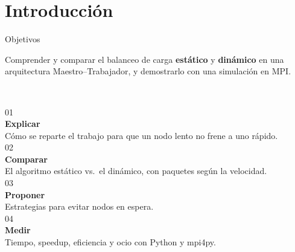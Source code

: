 \documentclass[aspectratio=169,11pt,t]{beamer}
\newcommand{\numeral}[2]{{\kalamL\fontsize{30}{32}\selectfont\color{#1}#2}}
\newcommand{\linea}{{\color{regla}\rule{\linewidth}{.5pt}}}
\begin{document}
\section{Introducción}
\begin{frame}{Objetivos}
{\kalamL\fontsize{15}{20}\selectfont Comprender y comparar el balanceo de carga \textbf{\color{estatico}estático} y \textbf{\color{dinamico}dinámico} en una arquitectura Maestro–Trabajador, y demostrarlo con una simulación en MPI.\par}
\vspace{.55cm}
\begin{columns}[T,onlytextwidth]
\column{.22\textwidth}\linea\\[3pt]\numeral{estatico}{01}\\[2pt]\textbf{Explicar}\\[2pt]{\small\color{suave}Cómo se reparte el trabajo para que un nodo lento no frene a uno rápido.}
\column{.22\textwidth}\linea\\[3pt]\numeral{dinamico}{02}\\[2pt]\textbf{Comparar}\\[2pt]{\small\color{suave}El algoritmo estático vs.\ el dinámico, con paquetes según la velocidad.}
\column{.22\textwidth}\linea\\[3pt]\numeral{guiado}{03}\\[2pt]\textbf{Proponer}\\[2pt]{\small\color{suave}Estrategias para evitar nodos en espera.}
\column{.22\textwidth}\linea\\[3pt]\numeral{ocre}{04}\\[2pt]\textbf{Medir}\\[2pt]{\small\color{suave}Tiempo, speedup, eficiencia y ocio con Python y mpi4py.}
\end{columns}
\end{frame}

\end{document}
